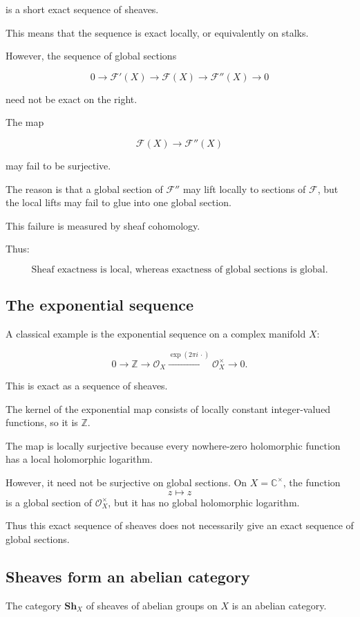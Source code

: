 \documentclass[12pt,a4paper]{article}
\newcommand{\Sh}{\mathbf{Sh}}
\theoremstyle{notespace}
\begin{document}
is a short exact sequence of sheaves.

This means that the sequence is exact locally, or equivalently on stalks.

However, the sequence of global sections

\[
0
\longrightarrow
\mathcal F'(X)
\longrightarrow
\mathcal F(X)
\longrightarrow
\mathcal F''(X)
\longrightarrow
0
\]

need not be exact on the right.

The map

\[
\mathcal F(X)\longrightarrow \mathcal F''(X)
\]

may fail to be surjective.

The reason is that a global section of $\mathcal F''$ may lift locally to
sections of $\mathcal F$, but the local lifts may fail to glue into one global
section.

This failure is measured by sheaf cohomology.

Thus:

\[
\boxed{
	\text{Sheaf exactness is local, whereas exactness of global sections is global.}
}
\]

\subsection{The exponential sequence}
A classical example is the exponential sequence on a complex manifold $X$:

\[
0
\longrightarrow
\mathbb Z
\longrightarrow
\mathcal O_X
\xrightarrow{\exp(2\pi i\,\cdot)}
\mathcal O_X^\times
\longrightarrow
0.
\]

This is exact as a sequence of sheaves.

The kernel of the exponential map consists of locally constant integer-valued
functions, so it is $\mathbb Z$.

The map is locally surjective because every nowhere-zero holomorphic function
has a local holomorphic logarithm.

However, it need not be surjective on global sections.
On $X=\mathbb C^\times$, the function
\[
z \mapsto z
\]
is a global section of $\mathcal O_X^\times$, but it has no global holomorphic
logarithm.

Thus this exact sequence of sheaves does not necessarily give an exact sequence
of global sections.

\subsection{Sheaves form an abelian category}
The category $\Sh_X$ of sheaves of abelian groups on $X$ is an abelian category.
\end{document}
